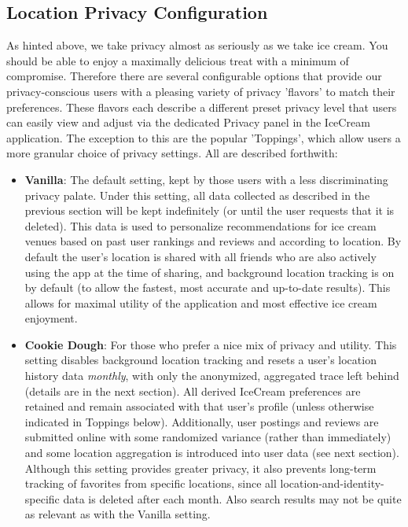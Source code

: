 \documentclass{article}
\begin{document}
\subsection{Location Privacy Configuration}
As hinted above, we take privacy almost as seriously as we take ice cream. You should be able to enjoy a maximally delicious treat with a minimum of compromise.
Therefore there are several configurable options that provide our privacy-conscious users with a pleasing variety of privacy 'flavors' to match their preferences.
These flavors each describe a different preset privacy level that users can easily view and adjust via the dedicated Privacy panel in the IceCream application.
The exception to this are the popular 'Toppings', which allow users a more granular choice of privacy settings. All are described forthwith:
\begin{itemize}
  \item \textbf{Vanilla}: The default setting, kept by those users with a less discriminating privacy palate. Under this setting, all data collected as described in the previous section will be kept indefinitely (or until the user requests that it is deleted). This data is used to personalize recommendations for ice cream venues based on past user rankings and reviews and according to location. By default the user's location is shared with all friends who are also actively using the app at the time of sharing, and background location tracking is on by default (to allow the fastest, most accurate and up-to-date results). This allows for maximal utility of the application and most effective ice cream enjoyment.
  \item \textbf{Cookie Dough}: For those who prefer a nice mix of privacy and utility. This setting disables background location tracking and resets a user's location history data \textit{monthly}, with only the anonymized, aggregated trace left behind (details are in the next section). All derived IceCream preferences are retained and remain associated with that user's profile (unless otherwise indicated in Toppings below). Additionally, user postings and reviews are submitted online with some randomized variance (rather than immediately) and some location aggregation is introduced into user data (see next section). Although this setting provides greater privacy, it also prevents long-term tracking of favorites from specific locations, since all location-and-identity-specific data is deleted after each month. Also search results may not be quite as relevant as with the Vanilla setting.

\end{itemize}
\end{document}
